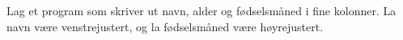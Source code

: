 %
%
Lag et program som skriver ut navn, alder og fødselsmåned i fine kolonner. La navn være venstrejustert, og la fødselsmåned være høyrejustert.
